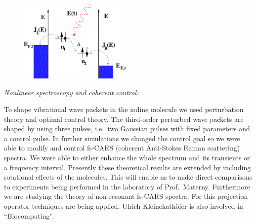 \begin{figure}[ht]
  \begin{center}
    \includegraphics[width=5.5cm]{Kleinekathoefer/kleinekathoefer_fig2.pdf}
 \label{fig:profkleinekathoefer2}
   \end{center}
\end{figure}





\emph{Nonlinear spectroscopy and coherent control:}

To shape vibrational wave packets in the iodine molecule we used
perturbation theory and optimal control theory.  The third-order perturbed
wave packets are shaped by using three pulses, i.e.\ two Gaussian pulses
with fixed parameters and a control pulse. In further simulations we
changed the control goal so we were able to modify and control fs-CARS
(coherent Anti-Stokes Raman scattering) spectra. We were able to either
enhance the whole spectrum and its transients or a frequency interval.
Presently these theoretical results are extended by including rotational
effects of the molecules. This  will enable us to make direct
comparisons to experiments being performed in the laboratory of Prof.\
Materny.  Furthermore we are studying the theory of non-resonant fs-CARS
spectra. For this projection operator techniques are being
applied.
 \newline \newline Ulrich Kleinekath\"ofer is also involved in
``Biocomputing".

